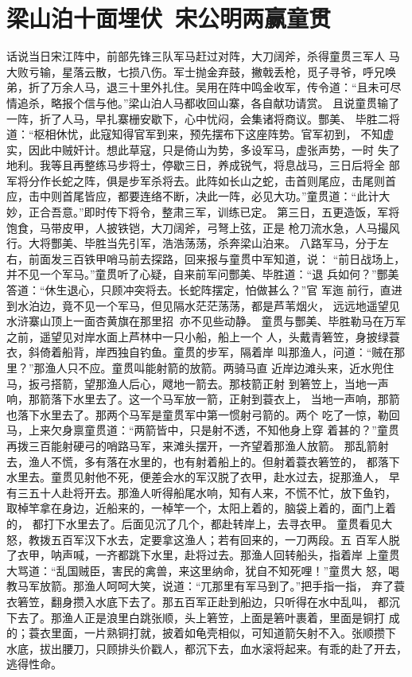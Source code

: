 \chapter{梁山泊十面埋伏~宋公明两赢童贯}

话说当日宋江阵中，前部先锋三队军马赶过对阵，大刀阔斧，杀得童贯三军人
马大败亏输，星落云散，七损八伤。军士抛金弃鼓，撇戟丢枪，觅子寻爷，呼兄唤
弟，折了万余人马，退三十里外扎住。吴用在阵中鸣金收军，传令道：“且未可尽
情追杀，略报个信与他。”梁山泊人马都收回山寨，各自献功请赏。
且说童贯输了一阵，折了人马，早扎寨栅安歇下，心中忧闷，会集诸将商议。酆美、
毕胜二将道：“枢相休忧，此寇知得官军到来，预先摆布下这座阵势。官军初到，
不知虚实，因此中贼奸计。想此草寇，只是倚山为势，多设军马，虚张声势，一时
失了地利。我等且再整练马步将士，停歇三日，养成锐气，将息战马，三日后将全
部军将分作长蛇之阵，俱是步军杀将去。此阵如长山之蛇，击首则尾应，击尾则首
应，击中则首尾皆应，都要连络不断，决此一阵，必见大功。”童贯道：“此计大
妙，正合吾意。”即时传下将令，整肃三军，训练已定。
第三日，五更造饭，军将饱食，马带皮甲，人披铁铠，大刀阔斧，弓弩上弦，正是
枪刀流水急，人马撮风行。大将酆美、毕胜当先引军，浩浩荡荡，杀奔梁山泊来。
八路军马，分于左右，前面发三百铁甲哨马前去探路，回来报与童贯中军知道，说：
“前日战场上，并不见一个军马。”童贯听了心疑，自来前军问酆美、毕胜道：“退
兵如何？”酆美答道：“休生退心，只顾冲突将去。长蛇阵摆定，怕做甚么？”官
军迤前行，直进到水泊边，竟不见一个军马，但见隔水茫茫荡荡，都是芦苇烟火，
远远地遥望见水浒寨山顶上一面杏黄旗在那里招，亦不见些动静。
童贯与酆美、毕胜勒马在万军之前，遥望见对岸水面上芦林中一只小船，船上一个
人，头戴青箬笠，身披绿蓑衣，斜倚着船背，岸西独自钓鱼。童贯的步军，隔着岸
叫那渔人，问道：“贼在那里？”那渔人只不应。童贯叫能射箭的放箭。两骑马直
近岸边滩头来，近水兜住马，扳弓搭箭，望那渔人后心，飕地一箭去。那枝箭正射
到箬笠上，当地一声响，那箭落下水里去了。这一个马军放一箭，正射到蓑衣上，
当地一声响，那箭也落下水里去了。那两个马军是童贯军中第一惯射弓箭的。两个
吃了一惊，勒回马，上来欠身禀童贯道：“两箭皆中，只是射不透，不知他身上穿
着甚的？”童贯再拨三百能射硬弓的哨路马军，来滩头摆开，一齐望着那渔人放箭。
那乱箭射去，渔人不慌，多有落在水里的，也有射着船上的。但射着蓑衣箬笠的，
都落下水里去。童贯见射他不死，便差会水的军汉脱了衣甲，赴水过去，捉那渔人，
早有三五十人赴将开去。那渔人听得船尾水响，知有人来，不慌不忙，放下鱼钓，
取棹竿拿在身边，近船来的，一棹竿一个，太阳上着的，脑袋上着的，面门上着的，
都打下水里去了。后面见沉了几个，都赴转岸上，去寻衣甲。
童贯看见大怒，教拨五百军汉下水去，定要拿这渔人；若有回来的，一刀两段。五
百军人脱了衣甲，呐声喊，一齐都跳下水里，赴将过去。那渔人回转船头，指着岸
上童贯大骂道：“乱国贼臣，害民的禽兽，来这里纳命，犹自不知死哩！”童贯大
怒，喝教马军放箭。那渔人呵呵大笑，说道：“兀那里有军马到了。”把手指一指，
弃了蓑衣箬笠，翻身攒入水底下去了。那五百军正赴到船边，只听得在水中乱叫，
都沉下去了。那渔人正是浪里白跳张顺，头上箬笠，上面是箬叶裹着，里面是铜打
成的；蓑衣里面，一片熟铜打就，披着如龟壳相似，可知道箭矢射不入。张顺攒下
水底，拔出腰刀，只顾排头价戳人，都沉下去，血水滚将起来。有乖的赴了开去，
逃得性命。

